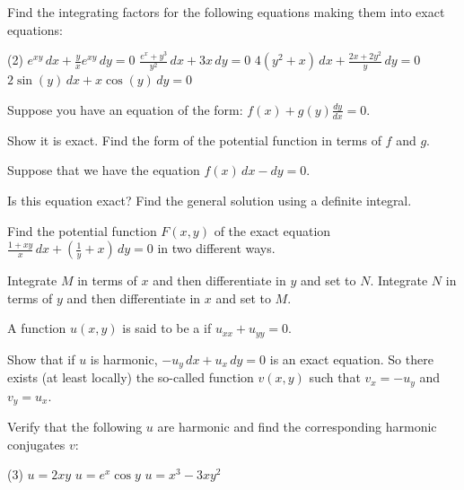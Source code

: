\begin{exercise}
\pagebreak[2]
Find the integrating factors for the following equations making them into
exact equations:
\begin{tasks}(2)
\task
$e^{xy} \, dx + \frac{y}{x} e^{xy} \, dy = 0$
\task
$\frac{e^x+y^3}{y^2} \, dx + 3x \, dy = 0$
\task
$4(y^2+x) \, dx + \frac{2x+2y^2}{y} \, dy = 0$
\task
$2\sin(y) \, dx + x\cos(y)\, dy = 0$
\end{tasks}
\end{exercise}

\begin{exercise}
\pagebreak[2]
Suppose you have an equation of the form:
$f(x) + g(y) \frac{dy}{dx} = 0$.
\begin{tasks}
\task
Show it is exact.
\task
Find the form of the potential function in terms of $f$ and $g$.
\end{tasks}
\end{exercise}

\begin{exercise}
Suppose that we have the equation $f(x) \, dx - dy = 0$.
\begin{tasks}
\task
Is this equation exact?
\task
Find the general solution using a definite integral.
\end{tasks}
\end{exercise}

\begin{exercise}
Find the potential function $F(x,y)$ of the exact equation $\frac{1+xy}{x}\, dx +
\left(\frac{1}{y} + x \right) \, dy = 0$ in two different ways.
\begin{tasks}
\task
Integrate $M$ in terms of $x$ and then differentiate in $y$ and set to
$N$.
\task
Integrate $N$ in terms of $y$ and then differentiate in $x$ and set to
$M$.
\end{tasks}
\end{exercise}

\begin{samepage}
\begin{exercise}
A function $u(x,y)$ is said to be a \emph{} if
$u_{xx} + u_{yy} = 0$.
\begin{tasks}
\task
Show that if $u$ is harmonic, $-u_y \, dx + u_x \, dy = 0$ is an exact
equation.  So there exists (at least locally)
the so-called \emph{} function
$v(x,y)$ such that $v_x = -u_y$ and $v_y = u_x$.
\end{tasks}
Verify that the following $u$ are harmonic and
find the corresponding harmonic conjugates $v$:
\begin{tasks}[resume](3)
\task $u = 2xy$
\task $u = e^x \cos y$
\task $u = x^3-3xy^2$
\end{tasks}
\end{exercise}
\end{samepage}


